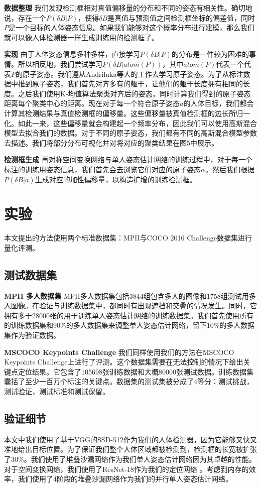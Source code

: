 \textbf{数据整理} 我们发现检测框相对真值偏移量的分布和不同的姿态有相关性。确切地说，存在一个$P(\delta B|P)$，使得$\delta B$是真值与预测值之间检测框坐标的偏差值，同时$P$是一个目标的人体姿态信息。如果我们能够对这个概率分布进行建模，那么我们就可以像人体检测器一样生成训练用的检测框了。

\textbf{实现} 由于人体姿态信息多种多样，直接学习$P(\delta B|P)$的分布是一件较为困难的事情。所以相反地，我们尝试学习$P(\delta B|atom(P))$，其中$atom(P)$代表一个代表$P$的原子姿态。我们遵从Andriluka等人的工作去学习原子姿态。为了从标注数据中推到原子姿态，我们首先对齐多有的躯干，让他们的躯干长度拥有相同的长度。之后我们使用K-均值算法聚类对齐后的姿态，同时计算我们得到的原子姿态距离每个聚类中心的距离。现在对于每一个符合原子姿态$a$的人体目标，我们都会计算其检测结果与真值检测框的偏移量。这些偏移量被真值检测框的边长所归一化。如此一来，这些偏移量就会构建起一个频率分布，因此我们可以使用高斯混合模型去拟合我们的数据。对于不同的原子姿态，我们都有不同的高斯混合模型参数去描述。我们将部分分布可视化并对将对应的聚类结果在图5中展示。

\textbf{检测框生成} 再对称空间变换网络与单人姿态估计网络的训练过程中，对于每一个标注的训练用姿态信息，我们首先会去浏览它们对应的原子姿态$\alpha$。然后我们根据$P(\delta B|a)$生成对应的加性偏移量，以构造扩增的训练检测框。

\section{实验}
本文提出的方法使用两个标准数据集：MPII与COCO 2016 Challenge数据集进行量化评测。

\subsection{测试数据集}
\textbf{MPII 多人数据集} MPII多人数据集包括3844组包含多人的图像和1758组测试用多人图像。在验证与训练数据集中，都同时有出现遮挡和交叠的情况发生。同时，它拥有多于28000张的用于训练单人姿态估计网络的训练数据集。我们首先使用所有的训练数据集和90\%的多人数据集来调整单人姿态估计网络，留下10\%的多人数据集作为验证数据。

\textbf{MSCOCO Keypoints Challenge} 我们同样使用我们的方法在MSCOCO Keypoints Challenge上进行了评测。这个数据集需要在无法控制的情况下给出关键点定位结果。它包含了105698张训练数据和大概80000张测试数据。训练数据集囊括了至少一百万个标注的关键点。数据集的测试集被分成了4等分：测试挑战，测试验证，测试标准和测试保留。

\subsection{验证细节}
本文中我们使用了基于VGG的SSD-512作为我们的人体检测器，因为它能够又快又准地给出目标位置。为了保证我们整个人体区域都被检测到，检测框的长宽被扩张了30\%。我们使用了堆叠沙漏网络作为我们单人姿态估计网络因为其卓越的性能。对于空间变换网络，我们使用了ResNet-18作为我们的定位网络 。考虑到内存的效率，我们使用了4阶段的堆叠沙漏网络作为我们的并行单人姿态估计网络。

